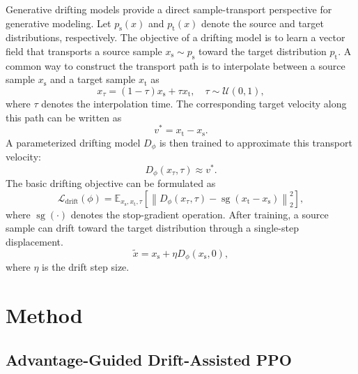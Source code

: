 \documentclass[conference]{IEEEtran}
\begin{document}
Generative drifting models provide a direct sample-transport perspective for generative modeling. Let $p_{\mathrm{s}}(x)$ and $p_{\mathrm{t}}(x)$ denote the source and target distributions, respectively. The objective of a drifting model is to learn a vector field that transports a source sample $x_{\mathrm{s}}\sim p_{\mathrm{s}}$ toward the target distribution $p_{\mathrm{t}}$. A common way to construct the transport path is to interpolate between a source sample $x_{\mathrm{s}}$ and a target sample $x_{\mathrm{t}}$ as
\begin{equation}
\label{eq:drift_interpolation}
    x_{\tau}=(1-\tau)x_{\mathrm{s}}+\tau x_{\mathrm{t}},
    \quad \tau \sim \mathcal{U}(0,1),
\end{equation}
where $\tau$ denotes the interpolation time. The corresponding target velocity along this path can be written as
\begin{equation}
\label{eq:drift_target_velocity}
    v^{*}=x_{\mathrm{t}}-x_{\mathrm{s}}.
\end{equation}
A parameterized drifting model $D_{\phi}$ is then trained to approximate this transport velocity:
\begin{equation}
\label{eq:drift_velocity_field}
    D_{\phi}(x_{\tau},\tau) \approx v^{*}.
\end{equation}
The basic drifting objective can be formulated as
\begin{equation}
\label{eq:drift_basic_loss}
    \mathcal{L}_{\mathrm{drift}}(\phi)
    =
    \mathbb{E}_{x_{\mathrm{s}},x_{\mathrm{t}},\tau}
    \left[
    \left\|
    D_{\phi}(x_{\tau},\tau)
    -
    \operatorname{sg}(x_{\mathrm{t}}-x_{\mathrm{s}})
    \right\|_2^2
    \right],
\end{equation}
where $\operatorname{sg}(\cdot)$ denotes the stop-gradient operation. After training, a source sample can drift toward the target distribution through a single-step displacement.
\begin{equation}
\label{eq:drift_sample_update}
    \tilde{x}
    =
    x_{\mathrm{s}}
    +
    \eta D_{\phi}(x_{\mathrm{s}},0),
\end{equation}
where $\eta$ is the drift step size.


\section{Method}
\subsection{Advantage-Guided Drift-Assisted PPO}
\label{subsec:agd_ppo_method}
\end{document}
